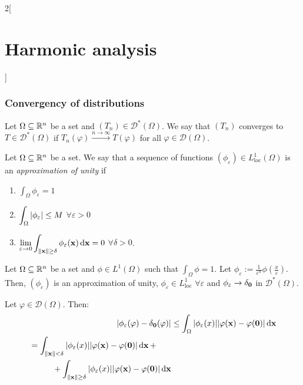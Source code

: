 \documentclass[../../../main_math.tex]{subfiles}
\begin{document}
\begin{multicols}{2}[\section{Harmonic analysis}]
  \subsubsection{Convergency of distributions}
  \begin{definition}
    Let $\Omega\subseteq \mathbb{R}^n$ be a set and $(T_n)\in \mathcal{D}^*(\Omega)$. We say that $(T_n)$ converges to $T\in\mathcal{D}^*(\Omega)$ if $T_n(\varphi)\overset{n\to\infty}{\longrightarrow}T(\varphi)$ for all $\varphi\in\mathcal{D}(\Omega)$.
  \end{definition}
  \begin{definition}
    Let $\Omega\subseteq \mathbb{R}^n$ be a set. We say that a sequence of functions $(\phi_\varepsilon)\in L_\mathrm{loc}^1(\Omega)$ is an \emph{approximation of unity} if
    \begin{enumerate}
      \item $\displaystyle\int_\Omega \phi_\varepsilon=1$
      \item $\displaystyle\int_\Omega \abs{\phi_\varepsilon}\leq M$ $\forall \varepsilon>0$
      \item $\displaystyle\lim_{\varepsilon\to 0}\int_{\left\|\boldsymbol{\mathrm{x}}\right\|\geq \delta}\phi_\varepsilon(\boldsymbol{\mathrm{x}})\dd{\boldsymbol{\mathrm{x}}}=0$ $\forall \delta>0$.
    \end{enumerate}
  \end{definition}
  \begin{proposition}
    Let $\Omega\subseteq \mathbb{R}^n$ be a set and $\phi\in L^1(\Omega)$ such that $\int_\Omega\phi=1$. Let $\phi_\varepsilon:=\frac{1}{\varepsilon^n}\phi(\frac{x}{\varepsilon})$. Then, $(\phi_\varepsilon)$ is an approximation of unity, $\phi_\varepsilon \in L_\mathrm{loc}^1$ $\forall \varepsilon$ and $\phi_\varepsilon\to \delta_{\boldsymbol{\mathrm{0}}}$ in $\mathcal{D}^*(\Omega)$.
  \end{proposition}
  \begin{sproof}
    Let $\varphi\in\mathcal{D}(\Omega)$. Then:
    \begin{align*}
      \abs{\phi_\varepsilon(\varphi)-\delta_{\vf{0}}(\varphi)} & \leq \int_\Omega \abs{\phi_\varepsilon(x)}\abs{\varphi(\vf{x})-\varphi(\vf{0})}\dd{\vf{x}} \\
      \begin{split}
        & =\int_{\norm{\vf{x}}<\delta} \abs{\phi_\varepsilon(x)}\abs{\varphi(\vf{x})-\varphi(\vf{0})}\dd{\vf{x}}+\\
        &\hspace{1cm}+\int_{\norm{\vf{x}}\geq\delta} \abs{\phi_\varepsilon(x)}\abs{\varphi(\vf{x})-\varphi(\vf{0})}\dd{\vf{x}}

\end{split}
\end{align*}
\end{sproof}
\end{multicols}
\end{document}
